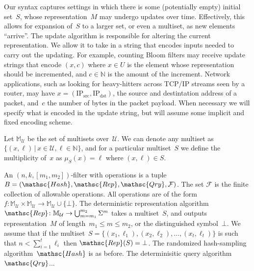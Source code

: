 
 Our syntax captures settings in which there is some (potentially empty) initial set~$S$, whose representation~$M$ may undergo updates over time.  Effectively, this allows for expansion of~$S$ to a larger set, or even a multiset, as new elements ``arrive''.    The update algorithm is responsible for altering the current representation.  We allow it to take in a string that encodes inputs needed to carry out the updating.  For example, counting Bloom filters may receive update strings that encode $(x,c)$ where $x \in U$ is the element whose representation should be incremented, and $c \in \mathbb{N}$ is the amount of the increment.  Network applications, such as looking for heavy-hitters across TCP/IP streams seen by a router, may have $x = (\mathrm{IP_{src}},\mathrm{IP_{dst}})$, the source and destintation address of a packet, and~$c$ the number of bytes in the packet payload.  When necessary we will specify what is encoded in the update string, but will assume some implicit and fixed encoding scheme.




Let $\mathbb{M}_\mathcal{U}$ be the set of multisets over~$\mathcal{U}$.  We can denote any multiset as $\{(x,\ell) \,|\, x \in \mathcal{U}, \ell \in \mathbb{N}\}$, and for a particular multiset~$S$ we define the multiplicity of~$x$ as $\mu_S(x) = \ell$ where $(x,\ell)\in S$.

An $(n,k,[m_1,m_2])$-filter with operations is a tuple  $B=(\mathsc{Hash},\mathsc{Rep},\mathsc{Qry}, \mathcal{F})$.  
The set $\mathcal{F}$ is the finite collection of allowable operations.  All operations are of the form 
$f: \mathbb{M}_{\mathcal{U}} \times \mathbb{M}_{\mathcal{U}} \rightarrow \mathbb{M}_{\mathcal{U}} \cup \{\bot\}$.  
%
The deterministic representation algorithm $\mathsc{Rep}\colon \mathbb{M}_\mathcal{U} \rightarrow \bigcup_{m=m_1}^{m_2}\Sigma^m$ takes a multiset~$S$, and outputs representation~$M$ of length~$m_1 \leq m \leq m_2$, or the distinguished symbol~$\bot$.  We assume that if the multiset~$S=\{(x_1,\ell_1),(x_2,\ell_2),\ldots,(x_t,\ell_t)\}$ is such that $n < \sum_{i=1}^t \ell_i$ then $\mathsc{Rep}(S)=\bot$.
%
The randomized hash-sampling algorithm~$\mathsc{Hash}$ is as before.
%
The determinisitic query algorithm $\mathsc{Qry}$... 

